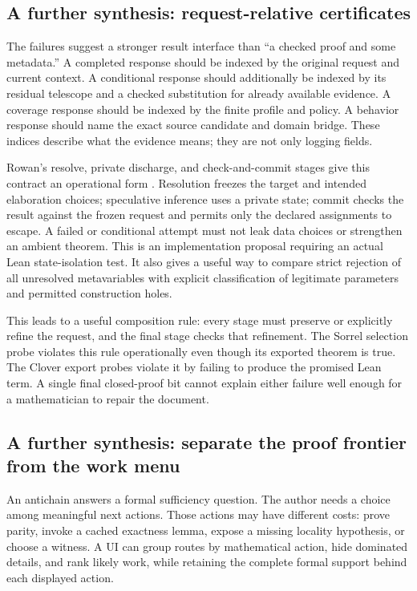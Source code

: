 \documentclass[11pt,letterpaper]{article}
\theoremstyle{definition}\newtheorem{definition}[proposition]{Definition}
\theoremstyle{remark}\newtheorem{remark}[proposition]{Remark}
\begin{document}
\subsection{A further synthesis: request-relative certificates}

The failures suggest a stronger result interface than ``a checked proof and
some metadata.'' A completed response should be indexed by the original
request and current context. A conditional response should additionally be
indexed by its residual telescope and a checked substitution for already
available evidence. A coverage response should be indexed by the finite
profile and policy. A behavior response should name the exact source candidate
and domain bridge. These indices describe what the evidence means; they
are not only logging fields.

Rowan's resolve, private discharge, and check-and-commit stages give this
contract an operational form \cite{rowan,parallel-r4}. Resolution freezes
the target and intended elaboration choices; speculative inference uses a
private state; commit checks the result against the frozen request and permits
only the declared assignments to escape. A failed or conditional attempt must
not leak data choices or strengthen an ambient theorem. This is an implementation
proposal requiring an actual Lean state-isolation test. It also gives a useful
way to compare strict rejection of all unresolved metavariables with explicit
classification of legitimate parameters and permitted construction holes.

This leads to a useful composition rule: every stage must preserve or
explicitly refine the request, and the final stage checks that refinement.
The Sorrel selection probe violates this rule operationally even though its
exported theorem is true. The Clover export probes violate it by failing to
produce the promised Lean term. A single final closed-proof bit cannot explain
either failure well enough for a mathematician to repair the document.

\subsection{A further synthesis: separate the proof frontier from the work menu}

An antichain answers a formal sufficiency question. The author needs a choice
among meaningful next actions. Those actions may have different costs:
prove parity, invoke a cached exactness lemma, expose a missing locality
hypothesis, or choose a witness. A UI can group routes by mathematical action,
hide dominated details, and rank likely work, while retaining the complete
formal support behind each displayed action.
\end{document}
